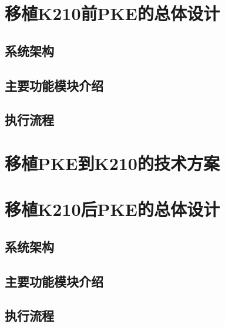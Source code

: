 \section{移植K210前PKE的总体设计}

\subsection{系统架构}

\subsection{主要功能模块介绍}

\subsection{执行流程}

\section{移植PKE到K210的技术方案}

\section{移植K210后PKE的总体设计}

\subsection{系统架构}

\subsection{主要功能模块介绍}

\subsection{执行流程}
